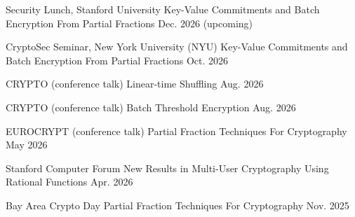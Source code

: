 
\begin{cventries}

  \cventry
    {Security Lunch, Stanford University}
    {Key-Value Commitments and Batch Encryption From Partial Fractions}
    {}
    {Dec. 2026 (upcoming)}
    {}


  \cventry
    {CryptoSec Seminar, New York University (NYU)}
    {Key-Value Commitments and Batch Encryption From Partial Fractions}
    {}
    {Oct. 2026}
    {}

  \cventry
    {CRYPTO (conference talk)}
    {Linear-time Shuffling}
    {}
    {Aug. 2026}
    {}

  \cventry
    {CRYPTO (conference talk)}
    {Batch Threshold Encryption}
    {}
    {Aug. 2026}
    {}

  \cventry
    {EUROCRYPT (conference talk)}
    {Partial Fraction Techniques For Cryptography}
    {}
    {May 2026}
    {}

  \cventry
    {Stanford Computer Forum}
    {New Results in Multi-User Cryptography Using Rational Functions}
    {}
    {Apr. 2026}
    {}

  \cventry
    {Bay Area Crypto Day}
    {Partial Fraction Techniques For Cryptography}
    {}
    {Nov. 2025}
    {}

\end{cventries}

